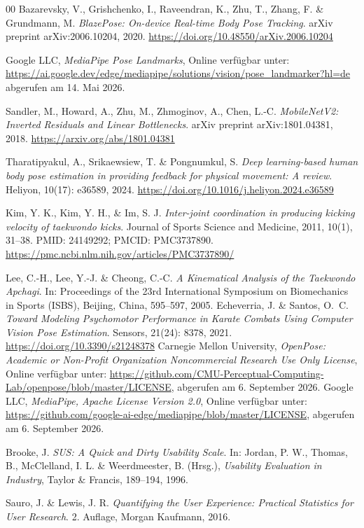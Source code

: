 \documentclass[intern]{cgMA}
\begin{document}
\begin{thebibliography}{00}
Bazarevsky, V., Grishchenko, I., Raveendran, K., Zhu, T., Zhang, F.
\& Grundmann, M.
\textit{BlazePose: On-device Real-time Body Pose Tracking}.
arXiv preprint arXiv:2006.10204, 2020.
\href{https://doi.org/10.48550/arXiv.2006.10204}{https://doi.org/10.48550/arXiv.2006.10204}

Google LLC,
\textit{MediaPipe Pose Landmarks},
Online verfügbar unter:
\url{https://ai.google.dev/edge/mediapipe/solutions/vision/pose\_landmarker?hl=de}
abgerufen am 14. Mai 2026.

Sandler, M., Howard, A., Zhu, M., Zhmoginov, A., Chen, L.-C.
\textit{MobileNetV2: Inverted Residuals and Linear Bottlenecks}.
arXiv preprint arXiv:1801.04381,
2018.
\url{https://arxiv.org/abs/1801.04381}

Tharatipyakul, A., Srikaewsiew, T. \& Pongnumkul, S.
\textit{Deep learning-based human body pose estimation in providing
feedback for physical movement: A review}.
Heliyon, 10(17): e36589, 2024.
\href{https://doi.org/10.1016/j.heliyon.2024.e36589}{https://doi.org/10.1016/j.heliyon.2024.e36589}

Kim, Y. K., Kim, Y. H., \& Im, S. J.
\textit{Inter-joint coordination in producing kicking velocity of taekwondo kicks}.
Journal of Sports Science and Medicine,
2011, 10(1), 31--38.
PMID: 24149292; PMCID: PMC3737890.
\url{https://pmc.ncbi.nlm.nih.gov/articles/PMC3737890/}

Lee, C.-H., Lee, Y.-J. \& Cheong, C.-C.
\textit{A Kinematical Analysis of the Taekwondo Apchagi}.
In: Proceedings of the 23rd International Symposium on Biomechanics in Sports (ISBS), Beijing, China, 595--597, 2005.
Echeverria, J. \& Santos, O.~C.
\textit{Toward Modeling Psychomotor Performance in Karate Combats
Using Computer Vision Pose Estimation}.
Sensors, 21(24): 8378, 2021.
\href{https://doi.org/10.3390/s21248378}{https://doi.org/10.3390/s21248378}
Carnegie Mellon University,
\textit{OpenPose: Academic or Non-Profit Organization Noncommercial
Research Use Only License},
Online verfügbar unter:
\url{https://github.com/CMU-Perceptual-Computing-Lab/openpose/blob/master/LICENSE},
abgerufen am 6. September 2026.
Google LLC,
\textit{MediaPipe, Apache License Version 2.0},
Online verfügbar unter:
\url{https://github.com/google-ai-edge/mediapipe/blob/master/LICENSE},
abgerufen am 6. September 2026.

Brooke, J.
\textit{SUS: A Quick and Dirty Usability Scale}.
In: Jordan, P. W., Thomas, B., McClelland, I. L. \& Weerdmeester, B. (Hrsg.),
\textit{Usability Evaluation in Industry}, Taylor \& Francis, 189--194, 1996.

Sauro, J. \& Lewis, J. R.
\textit{Quantifying the User Experience: Practical Statistics for User Research}.
2. Auflage, Morgan Kaufmann, 2016.

\end{thebibliography}
\end{document}
